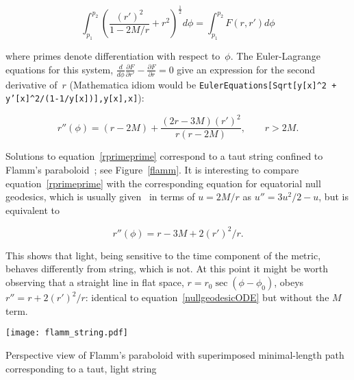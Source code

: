 \documentclass{ws-tpe}
\begin{document}

\begin{equation}
  \int_{p_1}^{p_2}\left(\frac{\left(r'\right)^2}{1-2M/r} + r^2\right)^\frac{1}{2}d\phi=
  \int_{p_1}^{p_2}F\left(r,r'\right)d\phi
\end{equation}

\noindent where primes denote differentiation with respect to~$\phi$.
The Euler-Lagrange equations for this system,
$\frac{d}{d\phi}\frac{\partial F}{\partial r'}-\frac{\partial
  F}{\partial r}=0$ give an expression for the second derivative
of~$r$ (Mathematica idiom would be {\tt EulerEquations[Sqrt[y[x]\^{}2
      + y'[x]\^{}2/(1-1/y[x])],y[x],x]}):

\begin{equation}\label{rprimeprime}
  r''\left(\phi\right) =
  (r-2M) + \frac{(2r-3M)\left(r'\right)^2}{r\left(r-2M\right)},\qquad r>2M.
\end{equation}

\noindent Solutions to equation~\ref{rprimeprime} correspond to a taut
string confined to Flamm's paraboloid~\cite{flamm1916}; see
Figure~\ref{flamm}.  It is interesting to compare
equation~\ref{rprimeprime} with the corresponding equation for
equatorial null geodesics, which is usually given~\cite{rindler} in
terms of $u=2M/r$ as $u''=3u^2/2-u$, but is equivalent
to

\begin{equation}\label{nullgeodesicODE}
  r''\left(\phi\right)=r-3M+2\left(r'\right)^2/r.
\end{equation}

This shows that
light, being sensitive to the time component of the metric, behaves
differently from string, which is not.  At this point it might be worth
observing that a straight line in flat space,
$r=r_0\sec\left(\phi-\phi_0\right)$, obeys
$r''=r+2\left(r'\right)^2/r$: identical to equation~\ref{nullgeodesicODE} but without the $M$ term.  

\begin{figurehere} %
\centering
\texttt{[image: flamm\_string.pdf]}
\caption{Perspective view of Flamm's paraboloid with superimposed minimal-length
  path corresponding to a taut, light string}
\label{flamm}
\end{figurehere}
\end{document}
